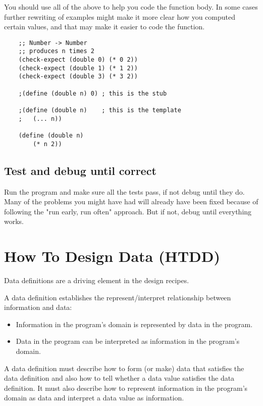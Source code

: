 \documentclass[11pt,a4paper]{report}
\begin{document}
	You should use all of the above to help you code the function body. In some cases further
	rewriting of examples might make it more clear how you computed certain values, and that may
	make it easier to code the function.
	
	\begin{verbatim}
	;; Number -> Number
	;; produces n times 2
	(check-expect (double 0) (* 0 2))
	(check-expect (double 1) (* 1 2))
	(check-expect (double 3) (* 3 2))
	
	;(define (double n) 0) ; this is the stub
	
	;(define (double n)    ; this is the template
	; 	(... n))
	
	(define (double n)
		(* n 2))
	\end{verbatim}
	
	\section{Test and debug until correct}
	Run the program and make sure all the tests pass, if not debug until they do. Many of the
	problems you might have had will already have been fixed because of following the "run early, run
	often" approach. But if not, debug until everything works.
	
	\chapter{How To Design Data (HTDD)} \label{ch:htdd}
	Data definitions are a driving element in the design recipes.
	
	A data definition establishes the represent/interpret relationship between information and data:
	\begin{itemize}
		\item Information in the program's domain is represented by data in the program.
		\item Data in the program can be interpreted as information in the program's domain.
	\end{itemize}

	A data definition must describe how to form (or make) data that satisfies the data definition and
	also how to tell whether a data value satisfies the data definition. It must also describe how to
	represent information in the program's domain as data and interpret a data value as information.
	
\end{document}
